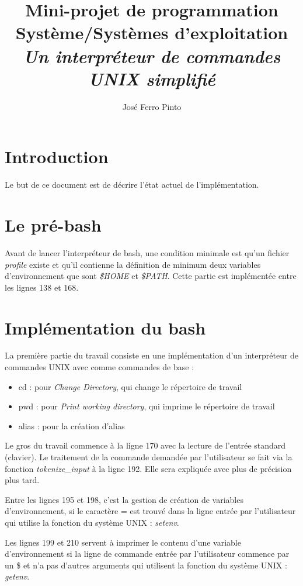 \documentclass[a4paper,10pt]{article}
\title{Mini-projet de programmation Système/Systèmes d’exploitation\\
\large\emph{Un interpréteur de commandes UNIX simplifié}}
\author{José Ferro Pinto}
\begin{document}
\maketitle

\section{Introduction}
Le but de ce document est de décrire l'état actuel de l'implémentation.

\section{Le pré-bash}
Avant de lancer l'interpréteur de bash, une condition minimale est qu'un fichier \emph{profile} existe et qu'il contienne la définition de minimum deux variables d'environnement que sont \emph{\$HOME} et \emph{\$PATH}.
Cette partie est implémentée entre les lignes 138 et 168.

\section{Implémentation du bash}

La première partie du travail consiste en une implémentation d'un interpréteur de commandes UNIX avec comme commandes de base :
\begin{itemize}
	\item cd : pour \emph{Change Directory}, qui change le répertoire de travail
	\item pwd : pour \emph{Print working directory}, qui imprime le répertoire de travail
	\item alias : pour la création d'alias
\end{itemize}

Le gros du travail commence à la ligne 170 avec la lecture de l'entrée standard (clavier). Le traitement de la commande demandée par l'utilisateur se fait via la fonction \emph{tokenize\_input} à la ligne 192. Elle sera expliquée avec plus de précision plus tard.

Entre les lignes 195 et 198, c'est la gestion de création de variables d'environnement, si le caractère = est trouvé dans la ligne entrée par l'utilisateur qui utilise la fonction du système UNIX : \emph{setenv}.

Les lignes 199 et 210 servent à imprimer le contenu d'une variable d'environnement si la ligne de commande entrée par l'utilisateur commence par un \$ et n'a pas d'autres arguments qui utilisent la fonction du système UNIX : \emph{getenv}.
\end{document}
